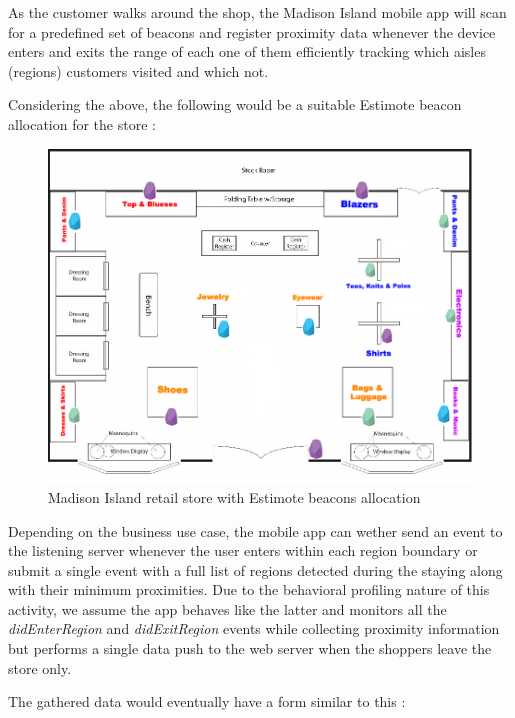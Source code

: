 As the customer walks around the shop, the Madison Island mobile app will scan for a predefined set of beacons and register proximity data whenever the device enters and exits the range of each one of them efficiently tracking which aisles (regions) customers visited and which not.

Considering the above, the following would be a suitable Estimote beacon allocation for the store :

\vspace{0.5cm}
\begin{figure}[H]
  \centering
    \includegraphics[width=16cm]{images/madison/retail-map-beacon.jpg}
  \caption{Madison Island retail store with Estimote beacons allocation}
  \label{fig:beacons-map}
\end{figure}
\vspace{0.5cm}

Depending on the business use case, the mobile app can wether send an event to the listening server whenever the user enters within each region boundary or submit a single event with a full list of regions detected during the staying along with their minimum proximities. Due to the behavioral profiling nature of this activity, we assume the app behaves like the latter and monitors all the \textit{didEnterRegion} and \textit{didExitRegion} events while collecting proximity information but performs a single data push to the web server when the shoppers leave the store only.


The gathered data would eventually have a form similar to this :

